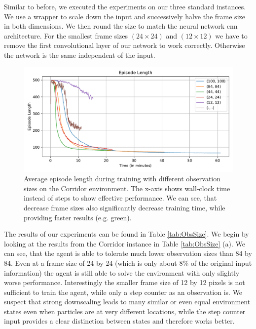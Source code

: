 Similar to before, we executed the experiments on our three standard instances. We use a wrapper to scale down the input and successively halve the frame size in both dimensions. We then round the size to match the neural network cnn architecture. For the smallest frame sizes $(24 \times 24)$ and $(12 \times 12)$ we have to remove the first convolutional layer of our network to work correctly. Otherwise the network is the same independent of the input.

\begin{figure}[htp]
    \begin{center}
        \includegraphics[clip, width=0.95\columnwidth]{figures/evaluation/observations/maze0318_ep_len_time.pdf}
    \end{center}
    \caption[Episode Length on the Corridor Environment using Different Observation Sizes]{Average episode length during training with different observation sizes on the Corridor environment. The x-axis shows wall-clock time instead of steps to show effective performance. We can see, that decrease frame sizes also significantly decrease training time, while providing faster results (e.g. green).} \label{fig:ObsSize/Maze0318/EpLen}
\end{figure}


The results of our experiments can be found in Table \ref{tab:ObsSize}. We begin by looking at the results from the Corridor instance in Table \ref{tab:ObsSize} (a). We can see, that the agent is able to tolerate much lower observation sizes than 84 by 84. Even at a frame size of 24 by 24 (which is only about 8\% of the original input information) the agent is still able to solve the environment with only slightly worse performance. Interestingly the smaller frame size of 12 by 12 pixels is not sufficient to train the agent, while only a step counter as an observation is. We suspect that strong downscaling leads to many similar or even equal environment states even when particles are at very different locations, while the step counter input provides a clear distinction between states and therefore works better.

